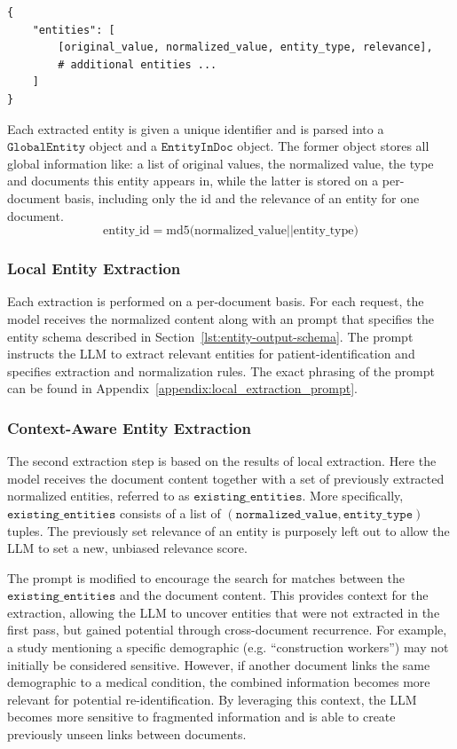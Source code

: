 \begin{lstlisting}[caption={Response JSON schema},label={lst:entity-output-schema}]
{
    "entities": [
        [original_value, normalized_value, entity_type, relevance],
        # additional entities ...
    ]
}
\end{lstlisting}

Each extracted entity is given a unique identifier and is parsed into a $\texttt{GlobalEntity}$ object and a $\texttt{EntityInDoc}$ object. The former object stores all global information like: a list of original values, the normalized value, the type and documents this entity appears in, while the latter is stored on a per-document basis, including only the id and the relevance of an entity for one document.
\[\mbox{entity\_id} = \mbox{md5(normalized\_value} \vert\vert \mbox{entity\_type)}\]



\subsubsection{Local Entity Extraction}
Each extraction is performed on a per-document basis. For each request, the model receives the normalized content along with an prompt that specifies the entity schema described in Section~\ref{lst:entity-output-schema}. The prompt instructs the LLM to extract relevant entities for patient-identification and specifies extraction and normalization rules. The exact phrasing of the prompt can be found in Appendix~\ref{appendix:local_extraction_prompt}.


\subsubsection{Context-Aware Entity Extraction}\label{subsubsec:context_extract}
The second extraction step is based on the results of local extraction. Here the model receives the document content together with a set of previously extracted normalized entities, referred to as $\texttt{existing\_entities}$. More specifically, $\texttt{existing\_entities}$ consists of a list of $(\texttt{normalized\_value}, \texttt{entity\_type})$ tuples. The previously set relevance of an entity is purposely left out to allow the LLM to set a new, unbiased relevance score.

The prompt is modified to encourage the search for matches between the $\texttt{existing\_entities}$ and the document content. This provides context for the extraction, allowing the LLM to uncover entities that were not extracted in the first pass, but gained potential through cross-document recurrence. For example, a study mentioning a specific demographic (e.g. ``construction workers'') may not initially be considered sensitive. However, if another document links the same demographic to a medical condition, the combined information becomes more relevant for potential re-identification. By leveraging this context, the LLM becomes more sensitive to fragmented information and is able to create previously unseen links between documents. %

